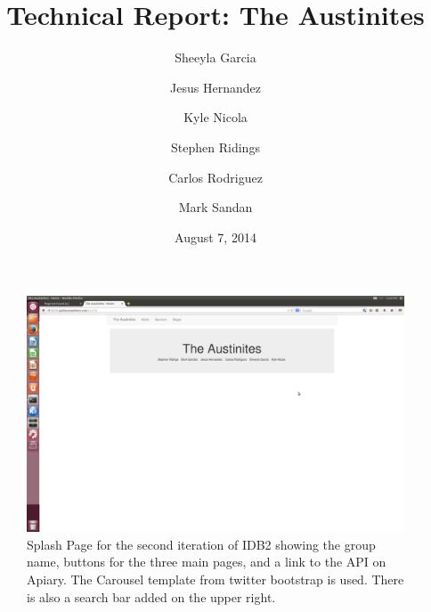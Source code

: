 \documentclass[12pt,english]{scrartcl}
\title{Technical Report: The Austinites}
\author{
  Sheeyla Garcia\\
  \and
  Jesus Hernandez\\
  \and
  Kyle Nicola\\
  \and
  Stephen Ridings\\
  \and
  Carlos Rodriguez\\
  \and
  Mark Sandan\\  
}
\date{ August 7, 2014 }
\begin{document}
\thispagestyle{plain}
\maketitle
\tableofcontents

\begin{figure}[h!]
\includegraphics[width=\textwidth]{home.png}
 \caption{Splash Page for the second iteration of IDB2 showing the group name, buttons for the three main pages, and a link to the API on Apiary. The Carousel template from twitter bootstrap is used. 
          There is also a search bar added on the upper right.}
\end{figure}
\end{document}
